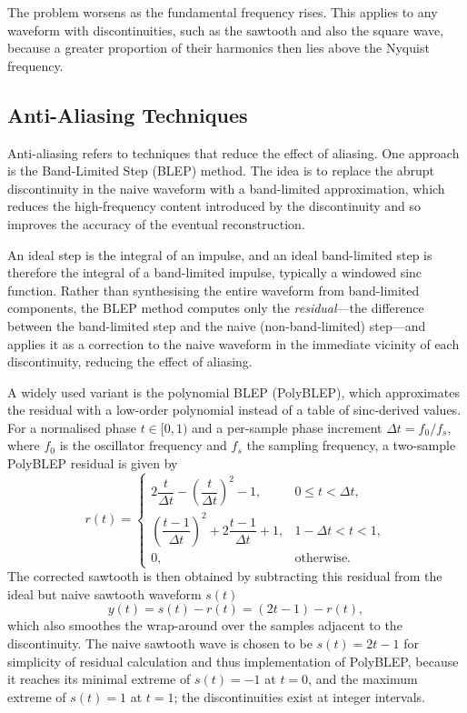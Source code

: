 The problem worsens as the fundamental frequency rises. This applies to any waveform with
discontinuities, such as the sawtooth and also the square wave, because a greater proportion of
their harmonics then lies above the Nyquist frequency.

\subsection{Anti-Aliasing Techniques}
\noindent
Anti-aliasing refers to techniques that reduce the effect of aliasing. One approach is the
Band-Limited Step (BLEP) method. The idea is to replace the abrupt discontinuity in the naive
waveform with a band-limited approximation, which reduces the high-frequency content introduced
by the discontinuity and so improves the accuracy of the eventual reconstruction.

An ideal step is the integral of an impulse, and an ideal band-limited step is therefore
the integral of a band-limited impulse, typically a windowed sinc function\cite{BLEP}. 
Rather than synthesising the entire waveform from band-limited components, the BLEP method 
computes only the \textit{residual}---the difference between the band-limited step and the naive 
(non-band-limited) step---and applies it as a correction to the naive waveform in the immediate 
vicinity of each discontinuity, reducing the effect of aliasing.

A widely used variant is the polynomial BLEP (PolyBLEP), which approximates the residual
with a low-order polynomial instead of a table of sinc-derived values\cite{PolyBLEP}. For a 
normalised phase
$t \in [0, 1)$ and a per-sample phase increment $\Delta t = f_0 / f_s$, where $f_0$ is the
oscillator frequency and $f_s$ the sampling frequency, a two-sample PolyBLEP residual is given by
\begin{equation}
  r(t) =
  \begin{cases}
    2\dfrac{t}{\Delta t} - \left(\dfrac{t}{\Delta t}\right)^{2} - 1,
      & 0 \le t < \Delta t, \\[2ex]
    \left(\dfrac{t - 1}{\Delta t}\right)^{2} + 2\dfrac{t - 1}{\Delta t} + 1,
      & 1 - \Delta t < t < 1, \\[2ex]
    0, & \text{otherwise.}
  \end{cases}
\end{equation}
The corrected sawtooth is then obtained by subtracting this residual from the ideal but naive 
sawtooth waveform $s(t)$
\begin{equation}
  y(t) = s(t) - r(t) = (2t - 1) - r(t),
\end{equation}
which also smoothes the wrap-around over the samples adjacent to the discontinuity. The naive sawtooth 
wave is chosen to be $s(t)=2t-1$ for simplicity of residual calculation and thus implementation 
of PolyBLEP, because it reaches its minimal extreme of $s(t)=-1$ at $t=0$, and the maximum extreme 
of $s(t)=1$ at $t=1$; the discontinuities exist at integer intervals.

